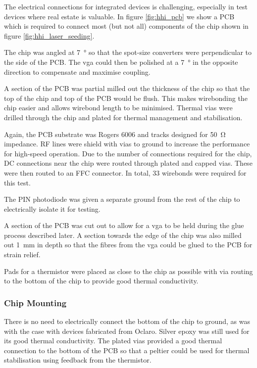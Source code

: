 The electrical connections for integrated devices is challenging, especially in test devices where real estate is valuable. In figure \ref{fig:hhi_pcb} we show a PCB which is required to connect most (but not all) components of the chip shown in figure \ref{fig:hhi_laser_seeding}. 

The chip was angled at \SI{7}{\degree} so that the spot-size converters were perpendicular to the side of the PCB. The \ac{vga} could then be polished at a \SI{7}{\degree} in the opposite direction to compensate and maximise coupling.

A section of the PCB was partial milled out the thickness of the chip so that the top of the chip and top of the PCB would be flush. This makes wirebonding the chip easier and allows wirebond length to be minimised. Thermal vias were drilled through the chip and plated for thermal management and stabilisation. 

Again, the PCB substrate was Rogers 6006 and tracks designed for \SI{50}{\ohm} impedance. RF lines were shield with vias to ground to increase the performance for high-speed operation. Due to the number of connections required for the chip, DC connections near the chip were routed through plated and capped vias. These were then routed to an FFC connector. In total, 33 wirebonds were required for this test.

The PIN photodiode was given a separate ground from the rest of the chip to electrically isolate it for testing.

A section of the PCB was cut out to allow for a \ac{vga} to be held during the glue process described later. A section towards the edge of the chip was also milled out \SI{1}{mm} in depth so that the fibres from the \ac{vga} could be glued to the PCB for strain relief.

Pads for a thermistor were placed as close to the chip as possible with via routing to the bottom of the chip to provide good thermal conductivity.

\subsubsection*{Chip Mounting}

There is no need to electrically connect the bottom of the chip to ground, as was with the case with devices fabricated from Oclaro. Silver epoxy was still used for its good thermal conductivity. The plated vias provided a good thermal connection to the bottom of the PCB so that a peltier could be used for thermal stabilisation using feedback from the thermistor.

